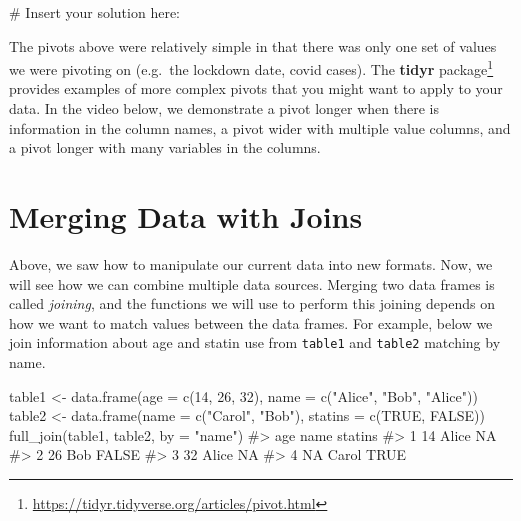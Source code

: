 \documentclass[
  letterpaper,
]{krantz}
\makeatletter
\newenvironment{Shaded}{\begin{snugshade}}{\end{snugshade}}
\newcommand{\AttributeTok}[1]{\textcolor[rgb]{0.40,0.45,0.13}{#1}}
\newcommand{\CommentTok}[1]{\textcolor[rgb]{0.37,0.37,0.37}{#1}}
\newcommand{\ConstantTok}[1]{\textcolor[rgb]{0.56,0.35,0.01}{#1}}
\newcommand{\DecValTok}[1]{\textcolor[rgb]{0.68,0.00,0.00}{#1}}
\newcommand{\FunctionTok}[1]{\textcolor[rgb]{0.28,0.35,0.67}{#1}}
\newcommand{\NormalTok}[1]{\textcolor[rgb]{0.00,0.23,0.31}{#1}}
\newcommand{\OtherTok}[1]{\textcolor[rgb]{0.00,0.23,0.31}{#1}}
\newcommand{\StringTok}[1]{\textcolor[rgb]{0.13,0.47,0.30}{#1}}
\renewcommand{\href}[2]{#2\footnote{\url{#1}}}
\newenvironment{kframe}{%
\medskip{}
\setlength{\fboxsep}{.8em}
 \def\at@end@of@kframe{}%
 \ifinner\ifhmode%
  \def\at@end@of@kframe{\end{minipage}}%
  \begin{minipage}{\columnwidth}%
 \fi\fi%
 \def\FrameCommand##1{\hskip\@totalleftmargin \hskip-\fboxsep
 \colorbox{shadecolor}{##1}\hskip-\fboxsep
     \hskip-\linewidth \hskip-\@totalleftmargin \hskip\columnwidth}%
 \MakeFramed {\advance\hsize-\width
   \@totalleftmargin\z@ \linewidth\hsize
   \@setminipage}}%
 {\par\unskip\endMakeFramed%
 \at@end@of@kframe}
\renewenvironment{Shaded}{\begin{kframe}}{\end{kframe}}
\makeatother
\begin{document}
\begin{Shaded}
\begin{Highlighting}[]
\CommentTok{\# Insert your solution here:}
\end{Highlighting}
\end{Shaded}

The pivots above were relatively simple in that there was only one set
of values we were pivoting on (e.g.~the lockdown date, covid cases). The
\href{https://tidyr.tidyverse.org/articles/pivot.html}{\textbf{tidyr}
package} provides examples of more complex pivots that you might want to
apply to your data. In the video below, we demonstrate a pivot longer
when there is information in the column names, a pivot wider with
multiple value columns, and a pivot longer with many variables in the
columns.

\section{Merging Data with Joins}\label{merging-data-with-joins}

Above, we saw how to manipulate our current data into new formats. Now,
we will see how we can combine multiple data sources. Merging two data
frames is called \emph{joining}, and the functions we will use to
perform this joining depends on how we want to match values between the
data frames. For example, below we join information about age and statin
use from \texttt{table1} and \texttt{table2} matching by name.

\begin{Shaded}
\begin{Highlighting}[]
\NormalTok{table1 }\OtherTok{\textless{}{-}} \FunctionTok{data.frame}\NormalTok{(}\AttributeTok{age =} \FunctionTok{c}\NormalTok{(}\DecValTok{14}\NormalTok{, }\DecValTok{26}\NormalTok{, }\DecValTok{32}\NormalTok{), }
                     \AttributeTok{name =} \FunctionTok{c}\NormalTok{(}\StringTok{"Alice"}\NormalTok{, }\StringTok{"Bob"}\NormalTok{, }\StringTok{"Alice"}\NormalTok{))}
\NormalTok{table2 }\OtherTok{\textless{}{-}} \FunctionTok{data.frame}\NormalTok{(}\AttributeTok{name =} \FunctionTok{c}\NormalTok{(}\StringTok{"Carol"}\NormalTok{, }\StringTok{"Bob"}\NormalTok{), }
                     \AttributeTok{statins =} \FunctionTok{c}\NormalTok{(}\ConstantTok{TRUE}\NormalTok{, }\ConstantTok{FALSE}\NormalTok{))}
\FunctionTok{full\_join}\NormalTok{(table1, table2, }\AttributeTok{by =} \StringTok{"name"}\NormalTok{)}
\CommentTok{\#\textgreater{}   age  name statins}
\CommentTok{\#\textgreater{} 1  14 Alice      NA}
\CommentTok{\#\textgreater{} 2  26   Bob   FALSE}
\CommentTok{\#\textgreater{} 3  32 Alice      NA}
\CommentTok{\#\textgreater{} 4  NA Carol    TRUE}
\end{Highlighting}
\end{Shaded}
\end{document}
